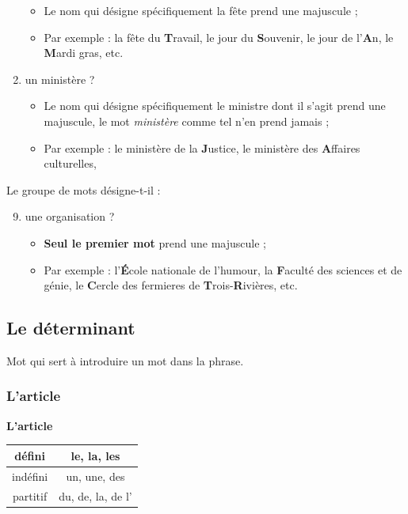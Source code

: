 \documentclass[10pt, french]{article}
\begin{document}
\begin{multicols*}{2}
\begin{enumerate}
		\begin{itemize}
		\item	Le nom qui désigne spécifiquement la fête prend une majuscule ;
		\item	Par exemple : la fête du \textbf{T}ravail, le jour du \textbf{S}ouvenir, le jour de l'\textbf{A}n, le \textbf{M}ardi gras, etc.
		\end{itemize}
	\item	un ministère ?
		\begin{itemize}
		\item	Le nom qui désigne spécifiquement le ministre dont il s'agit prend une majuscule, le mot \textit{ministère} comme tel n'en prend jamais ;
		\item	Par exemple : le ministère de la \textbf{J}ustice, le ministère des \textbf{A}ffaires culturelles, 
		\end{itemize}
\end{enumerate}

Le groupe de mots désigne-t-il :
\begin{enumerate}
	\setcounter{enumi}{8}
	\item	une organisation ?
		\begin{itemize}
		\item	\textbf{Seul le premier mot} prend une majuscule ;
		\item	Par exemple : l'\textbf{É}cole nationale de l'humour, la \textbf{F}aculté des sciences et de génie, le \textbf{C}ercle des fermieres de \textbf{T}rois-\textbf{R}ivières, etc.
		\end{itemize}
\end{enumerate}

\columnbreak
\subsection{Le déterminant}
\begin{definitionNOHFILL}[Le déterminant]
Mot qui sert à introduire un mot dans la phrase.
\end{definitionNOHFILL}

\subsubsection{L'article}

\textbf{L'article}
\begin{center}
\begin{tabular}{| >{\columncolor{airforceblue}}c | >{\columncolor{beaublue}}c  |}
\hline
défini	&	le, la, les	\\\hline
indéfini	&	un, une, des	\\\hline
partitif	&	du, de, la, de l'\\\hline
\end{tabular}
\end{center}


\end{multicols*}
\end{document}
